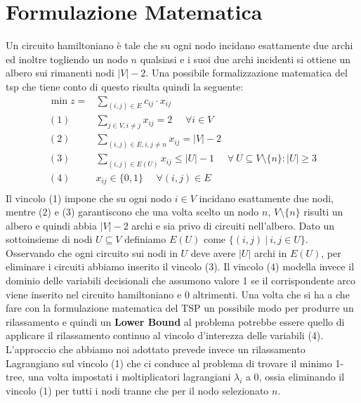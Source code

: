 \documentclass[
	article,			%
	12pt,				%
	oneside,			%
	a4paper,			%
	english,			%
	italian,				%
	sumario=tradicional,
	]{abntex2}
\begin{document}
\section{Formulazione Matematica}
Un circuito hamiltoniano è tale che su ogni nodo incidano esattamente due archi ed inoltre togliendo un nodo $n$ qualsiasi e i suoi due archi incidenti si ottiene un albero sui rimanenti nodi $|V| - 2$. Una possibile formalizzazione matematica del tsp che tiene conto di questo risulta quindi la seguente:
\begin{equation*}
    \begin{split}
        \min z = & \sum_{(i,j) \in E} c_{ij} \cdot x_{ij}\\
        (1)\:\:\:\:\:\: & \sum_{j \in V, i \neq j} x_{ij} = 2 \:\:\:\:\:\: \forall i \in V \\
        (2) \:\:\:\:\:\: & \sum_{(i,j)\in E, i, j \neq n} x_{ij} = |V|-2 \\
        (3) \:\:\:\:\:\: & \sum_{(i,j) \in E(U)} x_{ij} \leq |U| - 1 \:\:\:\:\:\: \forall\: U \subseteq V\setminus\{n\} : |U| \geq 3 \\
        (4) \:\:\:\:\:\: & x_{ij} \in \{0,1\} \:\:\:\:\:\: \forall (i,j) \in E\\
    \end{split}
\end{equation*}
Il vincolo (1) impone che su ogni nodo $i \in V$ incidano esattamente due nodi, mentre (2) e (3) garantiscono che una volta scelto un nodo $n$, $V \setminus \{n\}$ risulti un albero e quindi abbia $|V|-2$ archi e sia privo di circuiti nell'albero. 
\newline
Dato un sottoinsieme di nodi $U \subseteq V$ definiamo $E(U)$ come $\{ (i,j) \:|\: i,j \in U \}$.  Osservando che ogni circuito sui nodi in $U$ deve avere $|U|$ archi in $E(U)$, per eliminare i circuiti abbiamo inserito il vincolo (3). Il vincolo (4) modella invece il dominio delle variabili decisionali che assumono valore 1 se il corrispondente arco viene inserito nel circuito hamiltoniano e 0 altrimenti.
\newline
Una volta che si ha a che fare con la formulazione matematica del TSP un possibile modo per produrre un rilassamento e quindi un \textbf{Lower Bound} al problema potrebbe essere quello di applicare il rilassamento continuo al vincolo d'interezza delle variabili (4).
\newline
L'approccio che abbiamo noi adottato prevede invece un rilassamento Lagrangiano sul vincolo (1) che ci conduce al problema di trovare il minimo 1-tree, una volta impostati i moltiplicatori lagrangiani $\lambda_i$ a 0, ossia eliminando il vincolo (1) per tutti i nodi tranne che per il nodo selezionato $n$.
\end{document}
